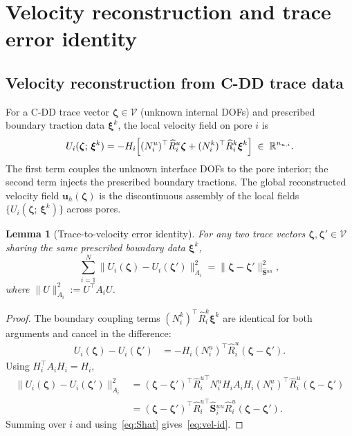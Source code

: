 \documentclass[11pt,a4paper]{article}
\newtheorem{lemma}[theorem]{Lemma}
\theoremstyle{definition}
\newcommand{\R}{\mathbb{R}}
\newcommand{\vel}{\bm{u}}
\newcommand{\Schur}{\mathbf{S}}
\newcommand{\Shatuu}{\widehat{\Schur}{}^{uu}}
\newcommand{\Vspace}{\mathcal{V}}
\begin{document}
\section{Velocity reconstruction and trace error identity}

\subsection{Velocity reconstruction from C-DD trace data}

For a C-DD trace vector $\bm{\zeta}\in\Vspace$ (unknown internal DOFs)
and prescribed boundary traction data $\bm{\xi}^k$, the local velocity
field on pore $i$ is
\begin{equation}\label{eq:reconstruct}
  U_i(\bm{\zeta};\,\bm{\xi}^k)
  = -H_i\Bigl[(N_i^u)^\top \widehat{R}_i^u \bm{\zeta}
               + (N_i^k)^\top \widehat{R}_i^k \bm{\xi}^k\Bigr]
  \;\in\; \R^{n_{u,i}}.
\end{equation}
The first term couples the unknown interface DOFs to the pore
interior; the second term injects the prescribed boundary tractions.
The global reconstructed velocity field $\vel_h(\bm{\zeta})$ is the
discontinuous assembly of the local fields $\{U_i(\bm{\zeta};\,
\bm{\xi}^k)\}$ across pores.

\begin{lemma}[Trace-to-velocity error identity]\label{lem:vel-id}
  For any two trace vectors $\bm{\zeta},\bm{\zeta}'\in\Vspace$ sharing
  the same prescribed boundary data $\bm{\xi}^k$,
  \begin{equation}\label{eq:vel-id}
    \sum_{i=1}^N \|U_i(\bm{\zeta}) - U_i(\bm{\zeta}')\|_{A_i}^2
    = \|\bm{\zeta} - \bm{\zeta}'\|_{\Shatuu}^2,
  \end{equation}
  where $\|U\|_{A_i}^2 := U^\top A_i U$.
\end{lemma}

\begin{proof}
  The boundary coupling terms $(N_i^k)^\top \widehat{R}_i^k \bm{\xi}^k$
  are identical for both arguments and cancel in the difference:
  \begin{align*}
    U_i(\bm{\zeta}) - U_i(\bm{\zeta}')
    &= -H_i (N_i^u)^\top \widehat{R}_i^u (\bm{\zeta} - \bm{\zeta}').
  \end{align*}
  Using $H_i^\top A_i H_i = H_i$,
  \begin{align*}
    \|U_i(\bm{\zeta}) - U_i(\bm{\zeta}')\|_{A_i}^2
    &= (\bm{\zeta}-\bm{\zeta}')^\top \widehat{R}_i^{u\top}
       N_i^u H_i A_i H_i (N_i^u)^\top \widehat{R}_i^u
       (\bm{\zeta}-\bm{\zeta}') \\
    &= (\bm{\zeta}-\bm{\zeta}')^\top \widehat{R}_i^{u\top}
       \Shatuu_i \widehat{R}_i^u (\bm{\zeta}-\bm{\zeta}').
  \end{align*}
  Summing over $i$ and using~\eqref{eq:Shat} gives~\eqref{eq:vel-id}.
\end{proof}
\end{document}
